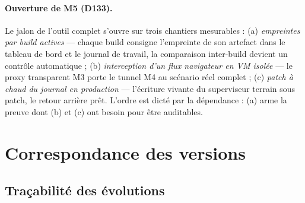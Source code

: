 \paragraph{Ouverture de M5 (D133).} Le jalon de l'outil complet s'ouvre sur trois
chantiers mesurables : (a) \emph{empreintes par build actives} — chaque build consigne
l'empreinte de son artefact dans le tableau de bord et le journal de travail, la
comparaison inter-build devient un contrôle automatique ; (b) \emph{interception d'un
flux navigateur en VM isolée} — le proxy transparent M3 porte le tunnel M4 au scénario
réel complet ; (c) \emph{patch à chaud du journal en production} — l'écriture vivante
du superviseur terrain sous patch, le retour arrière prêt. L'ordre est dicté par la
dépendance : (a) arme la preuve dont (b) et (c) ont besoin pour être auditables.

\section{Correspondance des versions}\label{sec:correspondance}

\subsection{Traçabilité des évolutions}\label{sec:evolutions}

